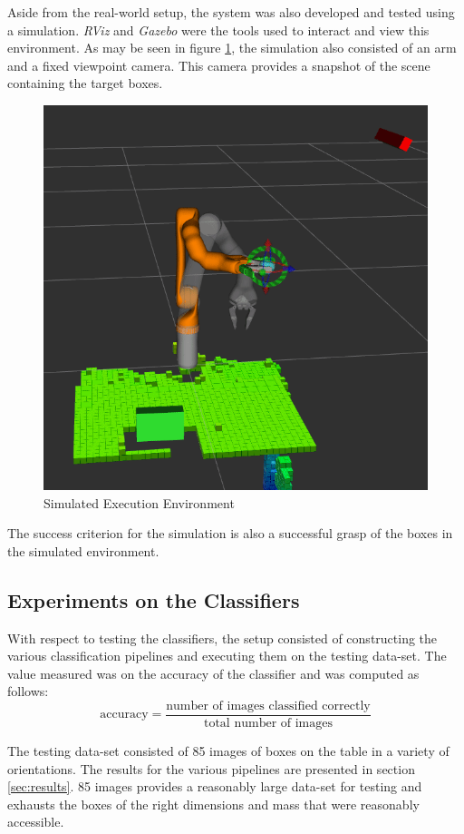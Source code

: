 \documentclass[letterpaper, 10 pt, conference]{conf/ieeeconf}  %
\begin{document}
Aside from the real-world setup, the system was also developed and tested using
a simulation. \textit{RViz} and \textit{Gazebo} were the tools used to interact
and view this environment. As may be seen in figure
\ref{fig:virtual_environment}, the simulation also consisted of an arm and a
fixed viewpoint camera. This camera provides a snapshot of the scene containing
the target boxes.

\begin{figure}[ht]
  \centering
  \includegraphics[width=0.8\linewidth]{virtual_environment.png}
  \caption{\label{fig:virtual_environment} Simulated Execution Environment}
\end{figure}

The success criterion for the simulation is also a successful grasp of the boxes
in the simulated environment.

\subsection{Experiments on the Classifiers}
With respect to testing the classifiers, the setup consisted of constructing the
various classification pipelines and executing them on the testing data-set. The
value measured was on the accuracy of the classifier and was computed as
follows:
\begin{equation*}
  \text{accuracy} = \dfrac{\text{number of images classified correctly}}{\text{total number of images}}
\end{equation*}

The testing data-set consisted of 85 images of boxes on the table in a variety
of orientations. The results for the various pipelines are presented in section
\ref{sec:results}. 85 images provides a reasonably large data-set for testing
and exhausts the boxes of the right dimensions and mass that were reasonably
accessible.\\
\end{document}
